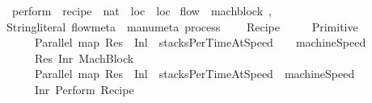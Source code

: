 \ perform\ {\isacharcolon}{\isacharcolon}\ {\isachardoublequoteopen}recipe\ {\isasymRightarrow}\ nat\ {\isasymRightarrow}\ loc\ {\isasymRightarrow}\ loc\isanewline
{}\ {\isacharparenleft}flow\ {\isacharplus}\ mach{\isacharunderscore}block{\isacharcomma}\ ,\isanewline
{}String{\isachardot}literal{\isacharcomma}\ flow{\isacharunderscore}meta\ {\isacharplus}\ manu{\isacharunderscore}meta{\isacharparenright}\ process{\isachardoublequoteclose}\isanewline
\ \ \ {\isachardoublequoteopen}\ {\isacharparenleft}Recipe\ \ \ {\isacharequal}\isanewline
\ \ Primitive\isanewline
\ \ \ \ {\isacharparenleft}\ Parallel\ {\isacharparenleft}map\ {\isacharparenleft}Res\ {\isasymcirc}\ Inl\ {\isasymcirc}\ stacksPerTimeAtSpeed\ \ \ \ {\isacharparenleft}machineSpeed\ \isanewline
{}\ {\isasymodot}\isanewline
\ \ \ \ \isaindent{\isacharparenleft}\ Res\ {\isacharparenleft}Inr\ {\isacharparenleft}MachBlock\ \isanewline
\ \ \ \ {\isacharparenleft}\ Parallel\ {\isacharparenleft}map\ {\isacharparenleft}Res\ {\isasymcirc}\ Inl\ {\isasymcirc}\ stacksPerTimeAtSpeed\ \ {\isacharparenleft}machineSpeed\ \isanewline
{}\isanewline
\ \ \ \ \isanewline
\ \ \ \ {\isacharparenleft}\ Inr\ {\isacharparenleft}Perform\ {\isacharparenleft}Recipe\ \ 

